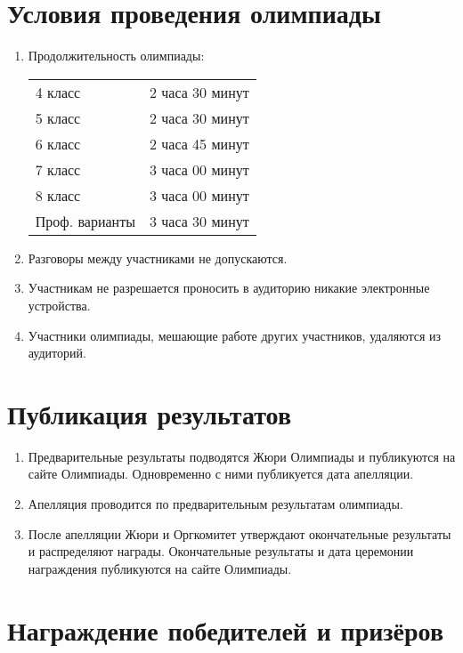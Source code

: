 \documentclass[a4paper,12pt]{article}
\begin{document}
\section{Условия проведения олимпиады}

\begin{enumerate}
	\item Продолжительность олимпиады: \begin{center} \begin{tabular}{ll}
		4 класс & 2 часа 30 минут \\
		5 класс & 2 часа 30 минут \\
		6 класс & 2 часа 45 минут \\
		7 класс & 3 часа 00 минут \\
		8 класс & 3 часа 00 минут \\
		Проф. варианты & 3 часа 30 минут \\
	\end{tabular} \end{center}
	\item Разговоры между участниками не допускаются.
	\item Участникам не разрешается проносить в аудиторию никакие электронные устройства.
	\item Участники олимпиады, мешающие работе других участников, удаляются из аудиторий.
\end{enumerate}

\section{Публикация результатов}

\begin{enumerate}
	\item Предварительные результаты подводятся Жюри Олимпиады и публикуются на сайте Олимпиады. Одновременно с ними публикуется дата апелляции. 
	\item Апелляция проводится по предварительным результатам олимпиады.
	\item После апелляции Жюри и Оргкомитет утверждают окончательные результаты и распределяют награды. Окончательные результаты и дата церемонии награждения публикуются на сайте Олимпиады.
\end{enumerate}

\section{Награждение победителей и призёров}
\end{document}
